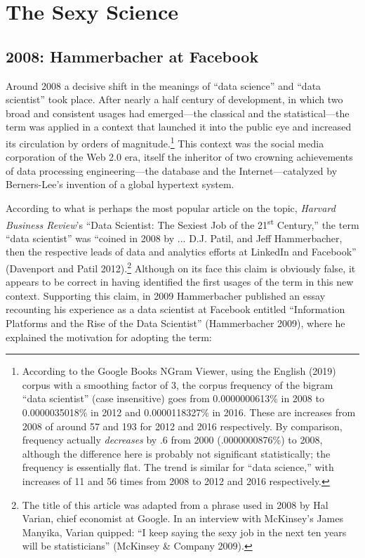 \documentclass[
  letterpaper,
]{report}
\begin{document}
\hypertarget{the-sexy-science}{%
\chapter{The Sexy Science}\label{the-sexy-science}}

\hypertarget{hammerbacher-at-facebook}{%
\section{2008: Hammerbacher at
Facebook}\label{hammerbacher-at-facebook}}

Around 2008 a decisive shift in the meanings of ``data science'' and
``data scientist'' took place. After nearly a half century of
development, in which two broad and consistent usages had emerged---the
classical and the statistical---the term was applied in a context that
launched it into the public eye and increased its circulation by orders
of magnitude.\footnote{According to the Google Books NGram Viewer, using
  the English (2019) corpus with a smoothing factor of 3, the corpus
  frequency of the bigram ``data scientist'' (case insensitive) goes
  from 0.0000000613\% in 2008 to 0.0000035018\% in 2012 and
  0.0000118327\% in 2016. These are increases from 2008 of around 57 and
  193 for 2012 and 2016 respectively. By comparison, frequency actually
  \emph{decreases} by .6 from 2000 (.0000000876\%) to 2008, although the
  difference here is probably not significant statistically; the
  frequency is essentially flat. The trend is similar for ``data
  science,'' with increases of 11 and 56 times from 2008 to 2012 and
  2016 respectively.} This context was the social media corporation of
the Web 2.0 era, itself the inheritor of two crowning achievements of
data processing engineering---the database and the Internet---catalyzed
by Berners-Lee's invention of a global hypertext system.

According to what is perhaps the most popular article on the topic,
\emph{Harvard Business Review}'s ``Data Scientist: The Sexiest Job of
the 21\textsuperscript{st} Century,'' the term ``data scientist'' was
``coined in 2008 by ... D.J. Patil, and Jeff Hammerbacher, then the
respective leads of data and analytics efforts at LinkedIn and
Facebook'' (Davenport and Patil 2012).\footnote{The title of this
  article was adapted from a phrase used in 2008 by Hal Varian, chief
  economist at Google. In an interview with McKinsey's James Manyika,
  Varian quipped: ``I keep saying the sexy job in the next ten years
  will be statisticians'' (McKinsey \& Company 2009).} Although on its
face this claim is obviously false, it appears to be correct in having
identified the first usages of the term in this new context. Supporting
this claim, in 2009 Hammerbacher published an essay recounting his
experience as a data scientist at Facebook entitled ``Information
Platforms and the Rise of the Data Scientist'' (Hammerbacher 2009),
where he explained the motivation for adopting the term:
\end{document}
